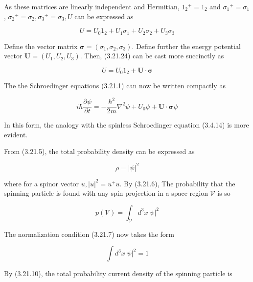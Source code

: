 \documentclass{article}
\begin{document}
As these matrices are linearly independent and Hermitian, $1_{2}{ }^{+}=1_{2}$ and $\sigma_{1}{ }^{+}=\sigma_{1}$, $\sigma_{2}{ }^{+}=\sigma_{2}, \sigma_{3}{ }^{+}=\sigma_{3}, U$ can be expressed as
 
\begin{equation*}
U=U_{0} 1_{2}+U_{1} \sigma_{1}+U_{2} \sigma_{2}+U_{3} \sigma_{3} \tag{3.21.24}
\end{equation*}
 

Define the vector matrix $\boldsymbol{\sigma}=\left(\sigma_{1}, \sigma_{2}, \sigma_{3}\right)$. Define further the energy potential vector $\boldsymbol{U}=\left(U_{1}, U_{2}, U_{3}\right)$. Then, (3.21.24) can be cast more succinctly as
 
\begin{equation*}
U=U_{0} 1_{2}+\boldsymbol{U} \cdot \boldsymbol{\sigma} \tag{3.21.25}
\end{equation*}
 

The the Schroedinger equations (3.21.1) can now be written compactly as
 
\begin{equation*}
i \hbar \frac{\partial \psi}{\partial t}=-\frac{\hbar^{2}}{2 m} \nabla^{2} \psi+U_{0} \psi+\boldsymbol{U} \cdot \boldsymbol{\sigma} \psi \tag{3.21.26}
\end{equation*}
 

In this form, the analogy with the spinless Schroedinger equation (3.4.14) is more evident.

From (3.21.5), the total probability density can be expressed as
 
\begin{equation*}
\rho=|\psi|^{2} \tag{3.21.27}
\end{equation*}
 
where for a spinor vector $u,|u|^{2}=u^{+} u$. By (3.21.6), The probability that the spinning particle is found with any spin projection in a space region $\mathcal{V}$ is so
 
\begin{equation*}
p(\mathcal{V})=\int_{\mathcal{V}} d^{3} x|\psi|^{2} \tag{3.21.28}
\end{equation*}
 

The normalization condition (3.21.7) now takes the form
 
\begin{equation*}
\int d^{3} x|\psi|^{2}=1 \tag{3.21.29}
\end{equation*}
 

By (3.21.10), the total probability current density of the spinning particle is
 
\end{document}
